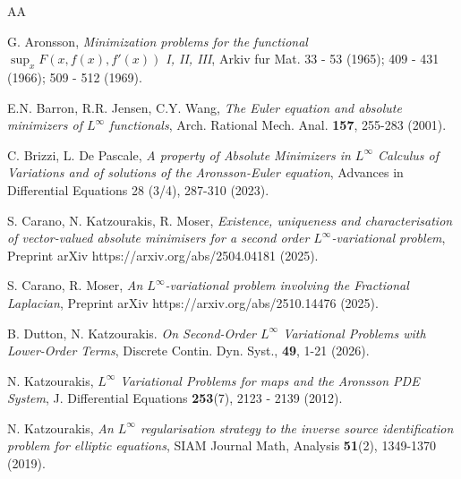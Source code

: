 \documentclass[a4paper,11pt]{article}
\numberwithin{equation}{section}
\theoremstyle{definition}
\begin{document}
\begin{thebibliography}{AA} 

G. Aronsson, {\it Minimization problems for the functional $\sup_xF(x, f(x), f'(x))$ I, II, III}, Arkiv
fur Mat. 33 - 53 (1965); 409 - 431 (1966); 509 - 512 (1969).

E.N. Barron, R.R. Jensen, C.Y. Wang, {\it The Euler equation and absolute minimizers of $L^\infty$ functionals}, Arch. Rational
Mech. Anal. {\bf 157}, 255-283 (2001).

 C. Brizzi, L. De Pascale, \emph{A property of Absolute Minimizers in $ L^{\infty}$  Calculus of Variations and of solutions of the Aronsson-Euler equation}, Advances in Differential Equations 28 (3/4), 287-310 (2023).

S. Carano, N. Katzourakis, R. Moser, \emph{
Existence, uniqueness and characterisation of vector-valued absolute minimisers for a second order $L^\infty$-variational problem}, Preprint arXiv https://arxiv.org/abs/2504.04181 (2025).

S. Carano, R. Moser, \emph{
An $L^\infty$-variational problem involving the Fractional Laplacian}, Preprint arXiv https://arxiv.org/abs/2510.14476 (2025).




B. Dutton, N. Katzourakis. {\it On Second-Order $L^\infty$ Variational Problems with Lower-Order Terms}, Discrete Contin. Dyn. Syst., {\bf 49}, 1-21 (2026).



N. Katzourakis, {\it $L^\infty$ Variational Problems for maps and the Aronsson PDE System}, J. Differential
Equations {\bf 253}(7), 2123 - 2139 (2012).

N. Katzourakis, {\it An $L^\infty$ regularisation strategy to the inverse source identification problem for elliptic equations}, SIAM Journal Math, Analysis {\bf 51}(2), 1349-1370 (2019).


\end{thebibliography}
\end{document}
